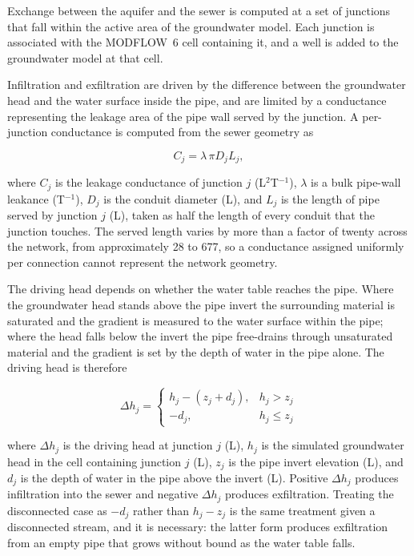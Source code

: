 \documentclass[preprint,authoryear,11pt]{elsarticle}
\begin{document}
Exchange between the aquifer and the sewer is computed at a set of junctions that fall within the active area of the groundwater model. Each junction is associated with the MODFLOW~6 cell containing it, and a well is added to the groundwater model at that cell.

Infiltration and exfiltration are driven by the difference between the groundwater head and the water surface inside the pipe, and are limited by a conductance representing the leakage area of the pipe wall served by the junction. A per-junction conductance is computed from the sewer geometry as

\begin{equation}
  C_{j} = \lambda \, \pi D_{j} L_{j} ,
  \label{eq:pipecond}
\end{equation}

\noindent where $C_{j}$ is the leakage conductance of junction $j$ (L$^{2}$T$^{-1}$), $\lambda$ is a bulk pipe-wall leakance (T$^{-1}$), $D_{j}$ is the conduit diameter (L), and $L_{j}$ is the length of pipe served by junction $j$ (L), taken as half the length of every conduit that the junction touches. The served length varies by more than a factor of twenty across the network, from approximately 28 to \SI{677}{\foot}, so a conductance assigned uniformly per connection cannot represent the network geometry.

The driving head depends on whether the water table reaches the pipe. Where the groundwater head stands above the pipe invert the surrounding material is saturated and the gradient is measured to the water surface within the pipe; where the head falls below the invert the pipe free-drains through unsaturated material and the gradient is set by the depth of water in the pipe alone. The driving head is therefore

\begin{equation}
  \Delta h_{j} =
  \begin{cases}
    h_{j} - \left( z_{j} + d_{j} \right), & h_{j} > z_{j} \\[4pt]
    -d_{j},                                & h_{j} \le z_{j}
  \end{cases}
  \label{eq:pot}
\end{equation}

\noindent where $\Delta h_{j}$ is the driving head at junction $j$ (L), $h_{j}$ is the simulated groundwater head in the cell containing junction $j$ (L), $z_{j}$ is the pipe invert elevation (L), and $d_{j}$ is the depth of water in the pipe above the invert (L). Positive $\Delta h_{j}$ produces infiltration into the sewer and negative $\Delta h_{j}$ produces exfiltration. Treating the disconnected case as $-d_{j}$ rather than $h_{j} - z_{j}$ is the same treatment given a disconnected stream, and it is necessary: the latter form produces exfiltration from an empty pipe that grows without bound as the water table falls.
\end{document}
